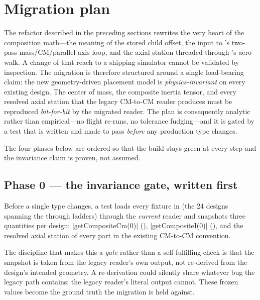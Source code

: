 \section{Migration plan}\label{sec:migration}

The refactor described in the preceding sections rewrites the very heart of the
composition math---the meaning of the stored child offset, the input to
's two-pass mass/CM/parallel-axis loop, and the axial
station threaded through 's aero walk. A change of that
reach to a shipping simulator cannot be validated by inspection. The migration is
therefore structured around a single load-bearing claim: the new geometry-driven
placement model is \emph{physics-invariant} on every existing design. The center of
mass, the composite inertia tensor, and every resolved axial station that the legacy
CM-to-CM reader produces must be reproduced \emph{bit-for-bit} by the migrated reader.
The plan is consequently analytic rather than empirical---no flight re-runs, no
tolerance fudging---and it is gated by a test that is written and made to pass
\emph{before} any production type changes.

The four phases below are ordered so that the build stays green at every step and the
invariance claim is proven, not assumed.

\subsection{Phase 0 --- the invariance gate, written first}

Before a single type changes, a test loads every fixture in
 (the 24  designs spanning the 
through  ladders) through the \emph{current} reader and snapshots three
quantities per design: \cppinline|getCompositeCm(0)| (),
\cppinline|getCompositeI(0)| (), and the resolved axial
station of every part in the existing \zfwd{} CM-to-CM convention.

The discipline that makes this a \emph{gate} rather than a self-fulfilling check is that
the snapshot is taken from the legacy reader's own output, not re-derived from the
design's intended geometry. A re-derivation could silently share whatever bug the
legacy path contains; the legacy reader's literal output cannot. These frozen values
become the ground truth the migration is held against.

